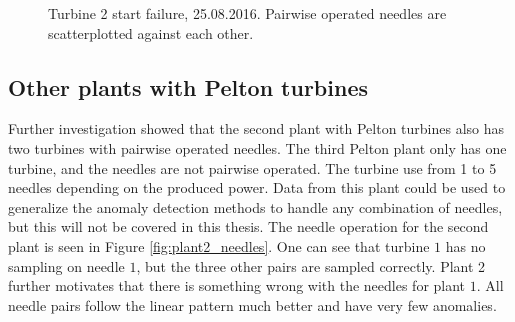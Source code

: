 \begin{figure}[h!]
\begin{minipage}[b]{0.49\linewidth}
                \caption{Turbine 2 start failure, 25.08.2016. Pairwise operated needles are scatterplotted against each other.}
                \label{fig:start_failure_turb2}
            \end{minipage}
        \end{figure}
        
        
    
    \subsection{Other plants with Pelton turbines}
        Further investigation showed that the second plant with Pelton turbines also has two turbines with pairwise operated needles. The third Pelton plant only has one turbine, and the needles are not pairwise operated. The turbine use from 1 to 5 needles depending on the produced power. Data from this plant could be used to generalize the anomaly detection methods to handle any combination of needles, but this will not be covered in this thesis. The needle operation for the second plant is seen in Figure \ref{fig:plant2_needles}. One can see that turbine $1$ has no sampling on needle $1$, but the three other pairs are sampled correctly. Plant 2 further motivates that there is something wrong with the needles for plant $1$. All needle pairs follow the linear pattern much better and have very few anomalies.
